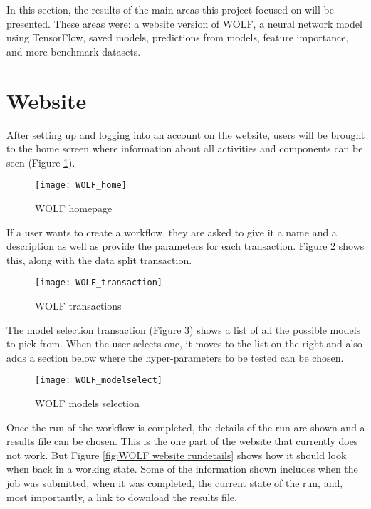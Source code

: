 In this section, the results of the main areas this project focused on will be presented. These areas were: a website version of WOLF, a neural network model using TensorFlow, saved models, predictions from models, feature importance, and more benchmark datasets.

\section*{Website}
After setting up and logging into an account on the website, users will be brought to the home screen where information about all activities and components can be seen (Figure \ref{fig:WOLF website home}).

\begin{figure}[H]
	\centering
	\texttt{[image: WOLF\_home]}
	\caption{WOLF homepage \parencite{WOLFpresentation}}
	\label{fig:WOLF website home}
\end{figure}

If a user wants to create a workflow, they are asked to give it a name and a description as well as provide the parameters for each transaction. Figure \ref{fig:WOLF website transaction} shows this, along with the data split transaction.

\begin{figure}[H]
	\centering
	\texttt{[image: WOLF\_transaction]}
	\caption{WOLF transactions \parencite{WOLFpresentation}}
	\label{fig:WOLF website transaction}
\end{figure}

The model selection transaction (Figure \ref{fig:WOLF website modelselect}) shows a list of all the possible models to pick from. When the user selects one, it moves to the list on the right and also adds a section below where the hyper-parameters to be tested can be chosen.

\begin{figure}[H]
	\centering
	\texttt{[image: WOLF\_modelselect]}
	\caption{WOLF models selection \parencite{WOLFpresentation}}
	\label{fig:WOLF website modelselect}
\end{figure}

Once the run of the workflow is completed, the details of the run are shown and a results file can be chosen. This is the one part of the website that currently does not work. But Figure \ref{fig:WOLF website rundetails} shows how it should look when back in a working state. Some of the information shown includes when the job was submitted, when it was completed, the current state of the run, and, most importantly, a link to download the results file.

